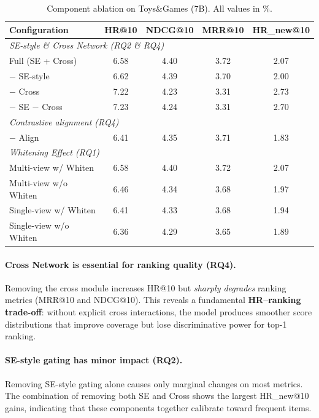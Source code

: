 \documentclass[sigconf,natbib=true,anonymous]{acmart}
\begin{document}
\begin{table}[t]
\caption{Component ablation on Toys\&Games (7B). All values in \%.}
\label{tab:ablation}
\centering
\scriptsize
\begin{tabular}{@{}lcccc@{}}
\toprule
\textbf{Configuration} & HR@10 & NDCG@10 & MRR@10 & HR\_new@10 \\
\midrule
\multicolumn{5}{l}{\textit{SE-style \& Cross Network (RQ2 \& RQ4)}} \\
Full (SE + Cross) & 6.58 & 4.40 & 3.72 & 2.07 \\
$-$ SE-style & 6.62 & 4.39 & 3.70 & 2.00 \\
$-$ Cross & 7.22 & 4.23 & 3.31 & 2.73 \\
$-$ SE $-$ Cross & 7.23 & 4.24 & 3.31 & 2.70 \\
\midrule
\multicolumn{5}{l}{\textit{Contrastive alignment (RQ4)}} \\
$-$ Align & 6.41 & 4.35 & 3.71 & 1.83 \\
\midrule
\multicolumn{5}{l}{\textit{Whitening Effect (RQ1)}} \\
Multi-view w/ Whiten & 6.58 & 4.40 & 3.72 & 2.07 \\
Multi-view w/o Whiten & 6.46 & 4.34 & 3.68 & 1.97 \\
Single-view w/ Whiten & 6.41 & 4.33 & 3.68 & 1.94 \\
Single-view w/o Whiten & 6.36 & 4.29 & 3.65 & 1.89 \\
\bottomrule
\end{tabular}
\end{table}

\paragraph{Cross Network is essential for ranking quality (RQ4).}
Removing the cross module increases HR@10 but \emph{sharply degrades}
ranking metrics (MRR@10 and NDCG@10).
This reveals a fundamental \textbf{HR--ranking trade-off}: without
explicit cross interactions, the model produces smoother score
distributions that improve coverage but lose discriminative power
for top-1 ranking.

\paragraph{SE-style gating has minor impact (RQ2).}
Removing SE-style gating alone causes only marginal changes on
most metrics. The combination of removing both SE and Cross
shows the largest HR\_new@10 gains, indicating that these
components together calibrate toward frequent items.
\end{document}
